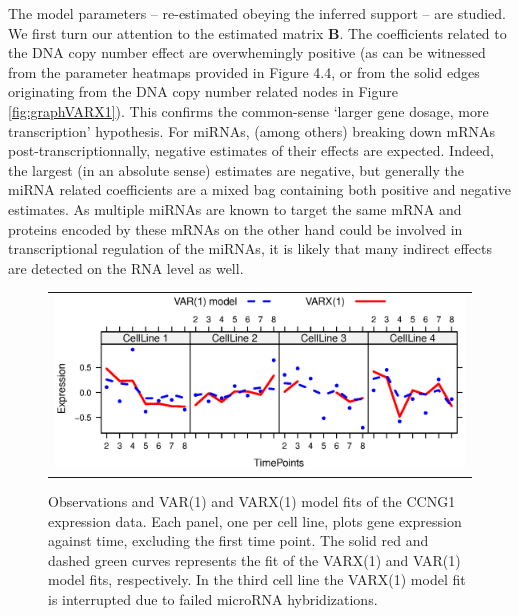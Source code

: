 {The model parameters -- re-estimated obeying the inferred support -- are studied. We first turn our attention to the estimated matrix $\mathbf{B}$. The coefficients related to the DNA copy number effect are overwhemingly positive (as can be witnessed from the parameter heatmaps provided in Figure 4.4, \cite{Supp2018} or from the solid edges originating from the DNA copy number related nodes in Figure \ref{fig:graphVARX1}). This confirms the common-sense `larger gene dosage, more transcription' hypothesis. For miRNAs, (among others) breaking down mRNAs post-transcriptionnally, negative estimates of their effects are expected. Indeed, the largest (in an absolute sense) estimates are negative, but generally the miRNA related coefficients are a mixed bag containing both positive and negative estimates. As multiple miRNAs are known to target the same mRNA and proteins encoded by these mRNAs on the other hand could be involved in transcriptional regulation of the miRNAs, it is likely that many indirect effects are detected on the RNA level as well.


\begin{figure}[h!]
\centering
\begin{tabular}{c}
\includegraphics[scale=0.8]{Figure_14.eps}\\
\end{tabular}
\caption{Observations and VAR(1) and VARX(1) model fits of the CCNG1 expression data. Each panel, one per cell line, plots gene expression against time, excluding the first time point. The solid red and dashed green curves represents the fit of the VARX(1) and VAR(1) model fits, respectively. In the third cell line the VARX(1) model fit is interrupted due to failed microRNA hybridizations. 
}
\label{fig:CCNG1fitVAR1-VARX1}  
\end{figure}


}
